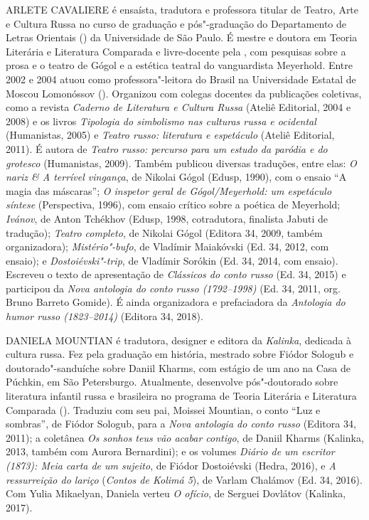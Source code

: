 \medskip

\noindent{}ARLETE CAVALIERE é ensaísta, tradutora e professora titular de Teatro,
Arte e Cultura Russa no curso de graduação e pós"-graduação do
Departamento de Letras Orientais () da Universidade de São Paulo. É
mestre e doutora em Teoria Literária e Literatura Comparada e
livre-docente pela , com pesquisas sobre a prosa e o teatro de Gógol
e a estética teatral do vanguardista Meyerhold. Entre 2002 e 2004 atuou
como professora"-leitora do Brasil na Universidade Estatal de Moscou
Lomonóssov (). Organizou com colegas docentes da  publicações
coletivas, como a revista \emph{Caderno de Literatura e Cultura
Russa} (Ateliê Editorial, 2004 e 2008) e os livros \emph{Tipologia do
simbolismo nas culturas russa e ocidental} (Humanistas, 2005) e
\emph{Teatro russo: literatura e espetáculo} (Ateliê Editorial, 2011). É
autora de \emph{Teatro russo: percurso para um estudo da paródia
e do grotesco} (Humanistas, 2009). Também publicou diversas traduções,
entre elas: \emph{O nariz \& A terrível vingança}, de Nikolai
Gógol (Edusp, 1990), com o ensaio ``A magia das máscaras''; \emph{O
inspetor geral de Gógol/Meyerhold: um espetáculo síntese} (Perspectiva,
1996), com ensaio crítico sobre a poética de Meyerhold; \emph{Ivánov},
de Anton Tchékhov (Edusp, 1998, cotradutora, finalista Jabuti de
tradução); \emph{Teatro completo}, de Nikolai Gógol (Editora 34, 2009,
também organizadora); \emph{Mistério"-bufo}, de Vladímir Maiakóvski (Ed.
34, 2012, com ensaio); e \emph{Dostoiévski"-trip}, de Vladímir Sorókin
(Ed. 34, 2014, com ensaio). Escreveu o texto de apresentação de
\emph{Clássicos do conto russo} (Ed. 34, 2015) e participou da
\emph{Nova antologia do conto russo (1792--1998)} (Ed. 34, 2011, org.
Bruno Barreto Gomide). É ainda organizadora e prefaciadora da
\emph{Antologia do humor russo (1823--2014)} (Editora 34, 2018).


\medskip

\noindent{}DANIELA MOUNTIAN é tradutora, designer e editora da \emph{Kalinka},
dedicada à cultura russa. Fez pela  graduação em história, mestrado
sobre Fiódor Sologub e doutorado"-sanduíche sobre Daniil Kharms, com
estágio de um ano na Casa de Púchkin, em São Petersburgo. Atualmente,
desenvolve pós"-doutorado sobre literatura infantil russa e brasileira no
programa de Teoria Literária e Literatura Comparada (). Traduziu com
seu pai, Moissei Mountian, o conto ``Luz e sombras'', de Fiódor Sologub,
para a \emph{Nova antologia do conto russo} (Editora 34, 2011); a
coletânea \emph{Os sonhos teus vão acabar contigo}, de Daniil Kharms
(Kalinka, 2013, também com Aurora Bernardini); e os volumes \emph{Diário
de um escritor (1873): Meia carta de um sujeito}, de Fiódor Dostoiévski
(Hedra, 2016), e \emph{A ressurreição do lariço} (\emph{Contos de Kolimá
5}), de Varlam Chalámov (Ed. 34, 2016). Com Yulia Mikaelyan, Daniela
verteu \emph{O ofício}, de Serguei Dovlátov (Kalinka, 2017).

